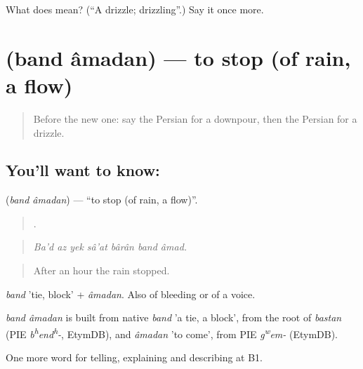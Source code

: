 \begin{tcolorbox}[breakable,colback=teal!4,colframe=teal!35!black,title={Before you move on}]
What does   mean? (\textquotedblleft{}A drizzle; drizzling\textquotedblright{}.) Say it once more.
\end{tcolorbox}
\section[\texorpdfstring{\fa{بند} \fa{آمدن} (band âmadan)}{بند آمدن (band âmadan)}]{  (band âmadan) — to stop (of rain, a flow)}

\label{lesson:FA-C474-band-amadan}



\begin{quote}
Before the new one: say the Persian for a downpour, then the Persian for a drizzle.
\end{quote}

\subsection*{You'll want to know:  }
\textbf{ } (\emph{band âmadan}) — \textquotedblleft{}to stop (of rain, a flow)\textquotedblright{}.

\begin{quote}
      .
\end{quote}

\begin{quote}
\emph{Ba'd az yek sâ'at bârân band âmad.}
\end{quote}

\begin{quote}
After an hour the rain stopped.
\end{quote}

\emph{band} 'tie, block' + \emph{âmadan}. Also of bleeding or of a voice.

\begin{cousinweb}
\emph{band âmadan} is built from native \emph{band} 'a tie, a block', from the root of \emph{bastan} (PIE \emph{b\textsuperscript{h}end\textsuperscript{h}-}, EtymDB), and \emph{âmadan} 'to come', from PIE \emph{g\textsuperscript{w}em-} (EtymDB).
\end{cousinweb}

\begin{grammarlens}[title={What you've built}]
One more word for telling, explaining and describing at B1.
\end{grammarlens}

